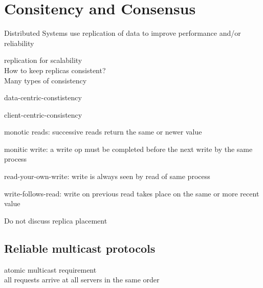 \documentclass[ngerman,a4paper]{report}
\begin{document}
\chapter{Consitency and Consensus}
\begin{compactitem}
	\item Distributed Systems use replication of data to improve performance and/or reliability
	\item replication for scalability\\
	How to keep replicas consistent?\\
	Many types of consistency\\
	\begin{compactitem}
		\item data-centric-constistency
		\item client-centric-consistency
	\item monotic reads: successive reads return the same or newer value
	\item monitic write: a write op must be completed before the next write by the same process
	\item read-your-own-write: write is always seen by read of same process
	\item write-follows-read: write on previous read takes place on the same or more recent value
	\end{compactitem}
	\item Do not discuss replica placement
\end{compactitem}
\section{Reliable multicast protocols}
\begin{compactitem}
	\item atomic multicast requirement\\
	all requests arrive at all servers in the same order
\end{compactitem}
\end{document}
